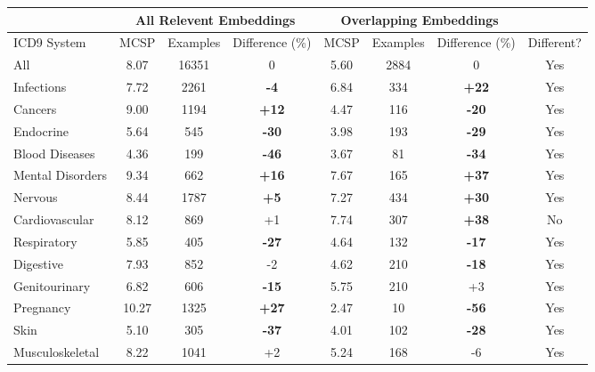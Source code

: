 \documentclass[11pt,a4paper]{article}
\def\blu#1{{\textbf{\color{blu}#1}}}
\def\ora#1{{\textbf{\color{ora}#1}}}
\begin{document}
\begin{table*}[h]
	\label{tab:onlybeamonlymcsp}
	\begin{tabular}{l|c|c|c|c|c|c|c}
		& \multicolumn{3}{c|}{All Relevent Embeddings} & \multicolumn{3}{c|}{Overlapping Embeddings} &            \\
		\hline
		ICD9 System          & MCSP  & Examples & Difference (\%) & MCSP & Examples & Difference (\%) & Different? \\
		\hline
		All                  & 8.07  & 16351    & 0               & 5.60 & 2884     & 0               & Yes        \\
		Infections           & 7.72  & 2261     & \blu{-4}       & 6.84 & 334      & \ora{+22}        & Yes        \\
		Cancers              & 9.00  & 1194     & \ora{+12}        & 4.47 & 116      & \blu{-20}       & Yes        \\
		Endocrine            & 5.64  & 545      & \blu{-30}       & 3.98 & 193      & \blu{-29}       & Yes        \\
		Blood Diseases       & 4.36  & 199      & \blu{-46}       & 3.67 & 81       & \blu{-34}       & Yes        \\
		Mental Disorders     & 9.34  & 662      & \ora{+16}        & 7.67 & 165      & \ora{+37}        & Yes        \\
		Nervous              & 8.44  & 1787     & \ora{+5}         & 7.27 & 434      & \ora{+30}        & Yes        \\
		Cardiovascular       & 8.12  & 869      & +1               & 7.74 & 307      & \ora{+38}        & No         \\
		Respiratory          & 5.85  & 405      & \blu{-27}       & 4.64 & 132      & \blu{-17}       & Yes        \\
		Digestive            & 7.93  & 852      & -2              & 4.62 & 210      & \blu{-18}       & Yes        \\
		Genitourinary        & 6.82  & 606      & \blu{-15}       & 5.75 & 210      & +3               & Yes        \\
		Pregnancy            & 10.27 & 1325     & \ora{+27}        & 2.47 & 10       & \blu{-56}       & Yes        \\
		Skin                 & 5.10  & 305      & \blu{-37}       & 4.01 & 102      & \blu{-28}       & Yes        \\
		Musculoskeletal        & 8.22  & 1041     & +2               & 5.24 & 168      & -6              & Yes        \\

\end{tabular}
\end{table*}
\end{document}
